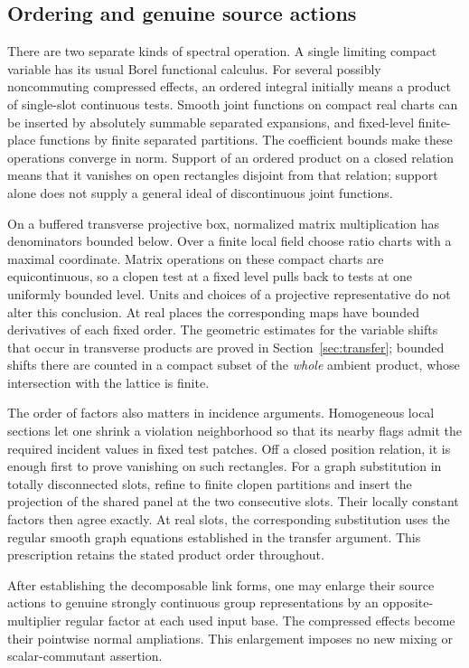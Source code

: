\subsection{Ordering and genuine source actions}

There are two separate kinds of spectral operation. A single
limiting compact variable has its usual Borel functional calculus.
For several possibly noncommuting compressed effects, an ordered
integral initially means a product of single-slot continuous tests.
Smooth joint functions on compact real charts can be inserted by
absolutely summable separated expansions, and fixed-level
finite-place functions by finite separated partitions. The
coefficient bounds make these operations converge in norm. Support
of an ordered product on a closed relation means that it vanishes
on open rectangles disjoint from that relation; support alone does
not supply a general ideal of discontinuous joint functions.

On a buffered transverse projective box, normalized matrix
multiplication has denominators bounded below. Over a finite local
field choose ratio charts with a maximal coordinate. Matrix
operations on these compact charts are equicontinuous, so a clopen
test at a fixed level pulls back to tests at one uniformly bounded
level. Units and choices of a projective representative do not
alter this conclusion. At real places the corresponding maps have
bounded derivatives of each fixed order. The geometric estimates
for the variable shifts that occur in transverse products are
proved in Section~\ref{sec:transfer}; bounded shifts there are
counted in a compact subset of the \emph{whole} ambient product,
whose intersection with the lattice is finite.

The order of factors also matters in incidence arguments. Homogeneous
local sections let one shrink a violation neighborhood so that its
nearby flags admit the required incident values in fixed test
patches. Off a closed position relation, it is enough first to
prove vanishing on such rectangles. For a graph substitution in
totally disconnected slots, refine to finite clopen partitions
and insert the projection of the shared panel at the two
consecutive slots. Their locally constant factors then agree
exactly. At real slots, the corresponding substitution uses the
regular smooth graph equations established in the transfer
argument. This prescription retains the stated product order
throughout.

\begin{lemma}
\label{lem:links-genuine-source}
After establishing the decomposable link forms, one may enlarge
their source actions to genuine strongly continuous group
representations by an opposite-multiplier regular factor at each
used input base. The compressed effects become their pointwise
normal ampliations. This enlargement imposes no new mixing or
scalar-commutant assertion.
\end{lemma}

